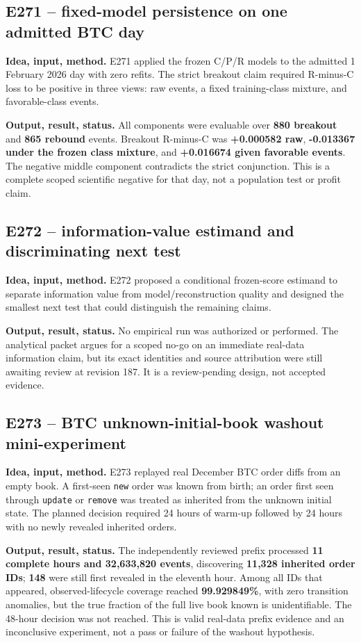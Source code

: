 \documentclass[10pt,a4paper]{article}
\begin{document}
\subsection{E271 -- fixed-model persistence on one admitted BTC day}
\textbf{Idea, input, method.} E271 applied the frozen C/P/R models to the admitted 1 February 2026 day with zero refits. The strict breakout claim required R-minus-C loss to be positive in three views: raw events, a fixed training-class mixture, and favorable-class events.\par
\textbf{Output, result, status.} All components were evaluable over \textbf{880 breakout} and \textbf{865 rebound} events. Breakout R-minus-C was \textbf{+0.000582 raw}, \textbf{-0.013367 under the frozen class mixture}, and \textbf{+0.016674 given favorable events}. The negative middle component contradicts the strict conjunction. This is a complete scoped scientific negative for that day, not a population test or profit claim.\par
\subsection{E272 -- information-value estimand and discriminating next test}
\textbf{Idea, input, method.} E272 proposed a conditional frozen-score estimand to separate information value from model/reconstruction quality and designed the smallest next test that could distinguish the remaining claims.\par
\textbf{Output, result, status.} No empirical run was authorized or performed. The analytical packet argues for a scoped no-go on an immediate real-data information claim, but its exact identities and source attribution were still awaiting review at revision 187. It is a review-pending design, not accepted evidence.\par
\subsection{E273 -- BTC unknown-initial-book washout mini-experiment}
\textbf{Idea, input, method.} E273 replayed real December BTC order diffs from an empty book. A first-seen \nolinkurl{new} order was known from birth; an order first seen through \nolinkurl{update} or \nolinkurl{remove} was treated as inherited from the unknown initial state. The planned decision required 24 hours of warm-up followed by 24 hours with no newly revealed inherited orders.\par
\textbf{Output, result, status.} The independently reviewed prefix processed \textbf{11 complete hours and 32,633,820 events}, discovering \textbf{11,328 inherited order IDs}; \textbf{148} were still first revealed in the eleventh hour. Among all IDs that appeared, observed-lifecycle coverage reached \textbf{99.929849\%}, with zero transition anomalies, but the true fraction of the full live book known is unidentifiable. The 48-hour decision was not reached. This is valid real-data prefix evidence and an inconclusive experiment, not a pass or failure of the washout hypothesis.\par
\end{document}
